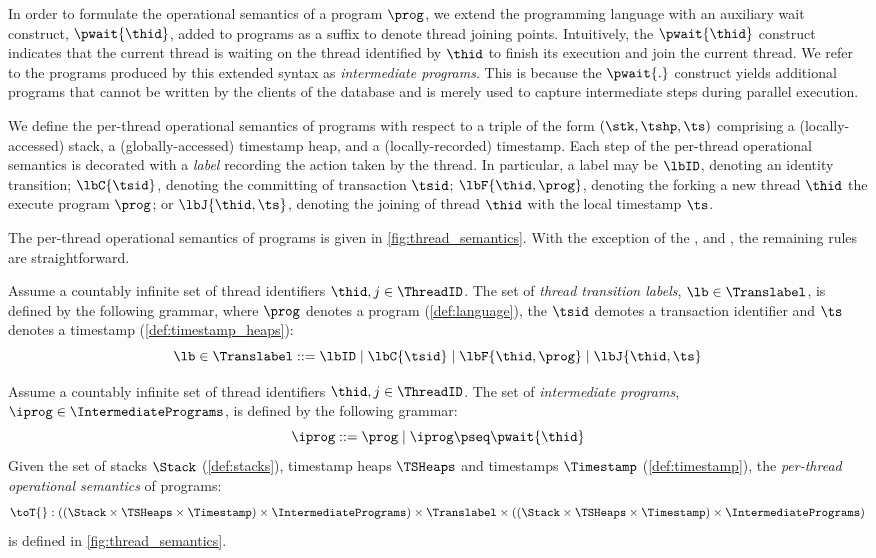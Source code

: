 In order to formulate the operational semantics of a program $\prog$, we extend the programming language with an auxiliary wait construct, \(\pwait{\thid} \), added to programs as a suffix to denote thread joining points.
Intuitively, the \( \pwait{\thid} \) construct indicates that the current thread is waiting on the thread identified by \( \thid \) to finish its execution and join the current thread. We refer to the programs produced by this extended syntax as \emph{intermediate programs}. This is because the $\pwait{.}$ construct yields additional programs that cannot be written by the clients of the database and is merely used to capture intermediate steps during parallel execution. 
%

We define the per-thread operational semantics of programs with respect to a triple of the form $(\stk, \tshp, \ts)$ comprising a (locally-accessed) stack, a (globally-accessed) timestamp heap, and a (locally-recorded) timestamp. 
Each step of the per-thread operational semantics is decorated with a \emph{label} recording the action taken by the thread. In particular, a label may be $\lbID$, denoting an identity transition; $\lbC{\tsid}$, denoting the committing of transaction $\tsid$; $\lbF{\thid, \prog}$, denoting the forking a new thread $\thid$ the execute program $\prog$; or $\lbJ{\thid, \ts}$, denoting the joining of thread $\thid$ with the local timestamp $\ts$.
  
The per-thread operational semantics of programs is given in \fig\ref{fig:thread_semantics}.
With the exception of the ,  and , the remaining rules are straightforward.

\begin{defn}
\label{def:label}
Assume a countably infinite set of thread identifiers $\thid,j \in \ThreadID$.
The set of \emph{thread transition labels}, $\lb \in \Translabel$, is defined by the following grammar, where $\prog$ denotes a program (\ref{def:language}), the $\tsid$ demotes a transaction identifier and $\ts$ denotes a timestamp (\ref{def:timestamp_heaps}):
\[
	\lb \in \Translabel ::= \lbID \mid \lbC{\tsid} \mid \lbF{\thid,\prog} \mid \lbJ{\thid,\ts} 
\]
\end{defn}

\begin{defn}
\label{def:thread_semantics}
Assume a countably infinite set of thread identifiers $\thid,j \in \ThreadID$.
The set of \emph{intermediate programs}, $\iprog \in \IntermediatePrograms$, is defined by the following grammar:
%
\[
    \iprog ::= \prog \mid \iprog \pseq \pwait{\thid}
\]
%
Given the set of stacks $\Stack$ (\ref{def:stacks}), timestamp heaps $\TSHeaps$ and timestamps $\Timestamp$ (\ref{def:timestamp}), the \emph{per-thread operational semantics} of programs:
%
\[
	\toT{} : 
	\left((\Stack \times \TSHeaps \times \Timestamp) \times \IntermediatePrograms \right) 
	\times \Translabel \times  
	\left((\Stack \times \TSHeaps \times \Timestamp) \times \IntermediatePrograms \right) 
\]
%
is defined in \fig\ref{fig:thread_semantics}.
\end{defn}

